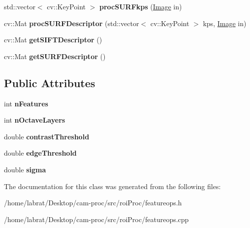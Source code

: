 \begin{DoxyCompactItemize}
\item 
std\+::vector$<$ cv\+::\+Key\+Point $>$ {\bfseries proc\+S\+U\+R\+Fkps} (\hyperlink{classImage}{Image} in)\hypertarget{classFeatureOps_aa3005b999d599ff0506741759adedddd}{}\label{classFeatureOps_aa3005b999d599ff0506741759adedddd}

\item 
cv\+::\+Mat {\bfseries proc\+S\+U\+R\+F\+Descriptor} (std\+::vector$<$ cv\+::\+Key\+Point $>$ kps, \hyperlink{classImage}{Image} in)\hypertarget{classFeatureOps_a9d4378d80684e42ff60385a22fa34da9}{}\label{classFeatureOps_a9d4378d80684e42ff60385a22fa34da9}

\item 
cv\+::\+Mat {\bfseries get\+S\+I\+F\+T\+Descriptor} ()\hypertarget{classFeatureOps_a5bc49020817c2ee8f662c646e4a52323}{}\label{classFeatureOps_a5bc49020817c2ee8f662c646e4a52323}

\item 
cv\+::\+Mat {\bfseries get\+S\+U\+R\+F\+Descriptor} ()\hypertarget{classFeatureOps_ae57a97bb375302e2050ea8723f152a23}{}\label{classFeatureOps_ae57a97bb375302e2050ea8723f152a23}

\end{DoxyCompactItemize}
\subsection*{Public Attributes}
\begin{DoxyCompactItemize}
\item 
int {\bfseries n\+Features}\hypertarget{classFeatureOps_a12a778e9a981bcf18b01ef9c27353e8b}{}\label{classFeatureOps_a12a778e9a981bcf18b01ef9c27353e8b}

\item 
int {\bfseries n\+Octave\+Layers}\hypertarget{classFeatureOps_a549c81bfcf4adfec6a7fa4f83610ee3f}{}\label{classFeatureOps_a549c81bfcf4adfec6a7fa4f83610ee3f}

\item 
double {\bfseries contrast\+Threshold}\hypertarget{classFeatureOps_a2b7ad53bcbc3dd13616fede2ba864631}{}\label{classFeatureOps_a2b7ad53bcbc3dd13616fede2ba864631}

\item 
double {\bfseries edge\+Threshold}\hypertarget{classFeatureOps_a843e1aa0f4c24ad7f708aa254954c518}{}\label{classFeatureOps_a843e1aa0f4c24ad7f708aa254954c518}

\item 
double {\bfseries sigma}\hypertarget{classFeatureOps_aaa707cfb31bb78a5b71679a12db8ccae}{}\label{classFeatureOps_aaa707cfb31bb78a5b71679a12db8ccae}

\end{DoxyCompactItemize}


The documentation for this class was generated from the following files\+:\begin{DoxyCompactItemize}
\item 
/home/labrat/\+Desktop/cam-\/proc/src/roi\+Proc/featureops.\+h\item 
/home/labrat/\+Desktop/cam-\/proc/src/roi\+Proc/featureops.\+cpp\end{DoxyCompactItemize}
